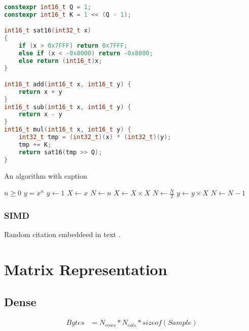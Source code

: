 \documentclass[oneside]{report}
\begin{document}
\begin{lstlisting}[language=C++]

constexpr int16_t Q = 1;
constexpr int16_t K = 1 << (Q - 1);

int16_t sat16(int32_t x)
{
	if (x > 0x7FFF) return 0x7FFF;
	else if (x < -0x8000) return -0x8000;
	else return (int16_t)x;
}

int16_t add(int16_t x, int16_t y) {
    return x + y
}
int16_t sub(int16_t x, int16_t y) {
    return x - y
}
int16_t mul(int16_t x, int16_t y) {
    int32_t tmp = (int32_t)(x) * (int32_t)(y);
    tmp += K;
    return sat16(tmp >> Q);
}
\end{lstlisting}

\begin{algorithm}
    \caption{An algorithm with caption}\label{alg:cap}
    \begin{algorithmic}[1]
        \Require $n \geq 0$
        \Ensure $y = x^n$
        \State $y \gets 1$
        \State $X \gets x$
        \State $N \gets n$
            \State $X \gets X \times X$
            \State $N \gets \frac{N}{2}$  
            \State $y \gets y \times X$
            \State $N \gets N - 1$
        \EndIf
        \EndWhile
    \end{algorithmic}
\end{algorithm}

\subsection{SIMD}

Random citation \cite{Wefers2014} embeddeed in \cite{Takahashi2019} text
\cite{Vorlnder2020}.

\chapter{Matrix Representation}

\section{Dense}

\begin{equation}
    \begin{split}
        Bytes & = N_{rows} * N_{cols} * sizeof(Sample) \\
    \end{split}
\end{equation}
\end{document}
